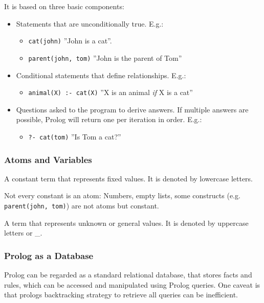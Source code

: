 \documentclass[
../EiKI_Summary.tex,
]
{subfiles}
\begin{document}
It is based on three basic components:
\begin{itemize}
    \item {} Statements that are unconditionally true. E.g.:
    \begin{itemize}
        \item \texttt{cat(john)} ''John is a cat''.
        \item \texttt{parent(john, tom)} ''John is the parent of Tom''
    \end{itemize}
    \item {} Conditional statements that define relationships. E.g.:
    \begin{itemize}
        \item \texttt{animal(X) :- cat(X)} ''X is an animal \textit{if} X is a cat''
    \end{itemize}
    \item {} Questions asked to the program to derive answers. If multiple answers are possible, Prolog will return one per iteration in order. E.g.: 
    \begin{itemize}
        \item \texttt{?- cat(tom)} ''Is Tom a cat?''
    \end{itemize}
\end{itemize}

\subsubsection{Atoms and Variables}
\begin{minipage}
    [t]{0.5\textwidth}
    \begin{defbox}
        [Atom]
        A constant term that represents fixed values. It is denoted by lowercase letters.

        Not every constant is an atom: Numbers, empty lists, some constructs (e.g. \texttt{parent(john, tom)}) are not atoms but constant.
    \end{defbox}
\end{minipage}
\begin{minipage}
    [t]{0.5\textwidth}
    \begin{defbox}
        [Variable]
        A term that represents unknown or general values. It is denoted by uppercase letters or \_. 
    \end{defbox}
\end{minipage}

\subsubsection{Prolog as a Database}
Prolog can be regarded as a standard relational database, that stores facts and rules, which can be accessed and manipulated using Prolog queries. One caveat is that prologs backtracking strategy to retrieve all queries can be inefficient.
\end{document}
